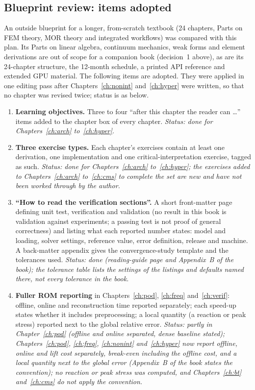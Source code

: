 \subsection{Blueprint review: items adopted}\label{sec:blueprint}
An outside blueprint for a longer, from-scratch textbook (24 chapters, Parts on FEM theory, MOR theory and integrated workflows) was compared with this plan. Its Parts on linear algebra, continuum mechanics, weak forms and element derivations are out of scope for a companion book (decision~1 above), as are its 24-chapter structure, the 12-month schedule, a printed API reference and extended GPU material. The following items are adopted. They were applied in one editing pass after Chapters~\ref{ch:nonint} and~\ref{ch:hyper} were written, so that no chapter was revised twice; status is as below.
\begin{enumerate}
\item \textbf{Learning objectives.} Three to four ``after this chapter the reader can \dots'' items added to the chapter box of every chapter. \emph{Status: done for Chapters~\ref{ch:arch} to~\ref{ch:hyper}.}
\item \textbf{Three exercise types.} Each chapter's exercises contain at least one derivation, one implementation and one critical-interpretation exercise, tagged as such. \emph{Status: done for Chapters~\ref{ch:arch} to~\ref{ch:hyper}; the exercises added to Chapters~\ref{ch:arch} to~\ref{ch:cms} to complete the set are new and have not been worked through by the author.}
\item \textbf{``How to read the verification sections''.} A short front-matter page defining unit test, verification and validation (no result in this book is validation against experiments; a passing test is not proof of general correctness) and listing what each reported number states: model and loading, solver settings, reference value, error definition, release and machine. A back-matter appendix gives the convergence-study template and the tolerances used. \emph{Status: done (reading-guide page and Appendix~B of the book); the tolerance table lists the settings of the listings and defaults named there, not every tolerance in the book.}
\item \textbf{Fuller ROM reporting} in Chapters~\ref{ch:pod}, \ref{ch:freq} and~\ref{ch:verif}: offline, online and reconstruction time reported separately; each speed-up states whether it includes preprocessing; a local quantity (a reaction or peak stress) reported next to the global relative error. \emph{Status: partly in Chapter~\ref{ch:pod} (offline and online separated, dense baseline stated); Chapters~\ref{ch:pod}, \ref{ch:freq}, \ref{ch:nonint} and~\ref{ch:hyper} now report offline, online and lift cost separately, break-even including the offline cost, and a local quantity next to the global error (Appendix~B of the book states the convention); no reaction or peak stress was computed, and Chapters~\ref{ch:bt} and~\ref{ch:cms} do not apply the convention.}

\end{enumerate}
